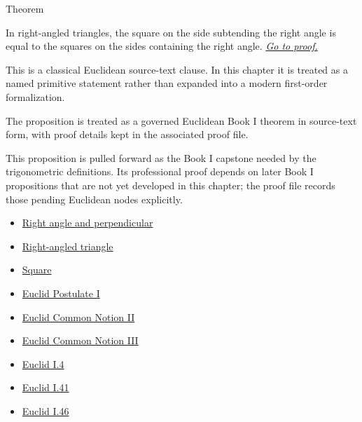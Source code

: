 \begin{theorembox}{Theorem}
\begin{theorem}
\label{thm:euclid-i-47}
\label{prop:I.47}
In right-angled triangles, the square on the side subtending the right angle is
equal to the squares on the sides containing the right angle.
\hyperref[prf:euclid-i-47]{\textit{Go to proof.}}
\end{theorem}
\end{theorembox}

\begin{remark*}
This is a classical Euclidean source-text clause. In this chapter it is treated
as a named primitive statement rather than expanded into a modern first-order
formalization.
\end{remark*}

\begin{remark*}[Interpretation]
The proposition is treated as a governed Euclidean Book I theorem in source-text
form, with proof details kept in the associated proof file.
\end{remark*}

\begin{remark*}[Exposition]
This proposition is pulled forward as the Book I capstone needed by the
trigonometric definitions. Its professional proof depends on later Book I
propositions that are not yet developed in this chapter; the proof file records
those pending Euclidean nodes explicitly.
\end{remark*}
\begin{lra-not-visible}
\begin{dependencies}
\begin{itemize}
  \item \hyperref[def:euclid-right-angle-and-perpendicular]{Right angle and perpendicular}
  \item \hyperref[def:euclid-triangle-angle-classes]{Right-angled triangle}
  \item \hyperref[def:euclid-quadrilateral-classes]{Square}
  \item \hyperref[ax:euclid-postulate-draw-straight-line]{Euclid Postulate I}
  \item \hyperref[ax:euclid-common-notion-add-equals]{Euclid Common Notion II}
  \item \hyperref[ax:euclid-common-notion-subtract-equals]{Euclid Common Notion III}
  \item \hyperref[thm:euclid-i-4]{Euclid I.4}
  \item \hyperref[thm:euclid-i-41]{Euclid I.41}
  \item \hyperref[thm:euclid-i-46]{Euclid I.46}
\end{itemize}
\end{dependencies}
\end{lra-not-visible}

